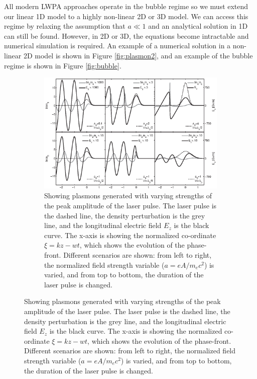 \documentclass[12pt,letter]{article}
\begin{document}
All modern LWPA approaches operate in the
bubble regime so we must extend our linear 1D model to a highly
non-linear  2D or 3D model. We can access this regime by relaxing 
the assumption that $a \ll 1$ and an analytical solution in 1D can still be
found\cite{sprangle1990nonlinear}. However, in 2D or 3D, the equations become intractable and numerical simulation is
required. An example of a numerical solution in a non-linear 2D model is shown
in Figure \ref{fig:plasmon2}, and an example of the bubble regime is shown in
Figure \ref{fig:bubble}.

\begin{figure}[h!]
        \begin{singlespace*}
        \centering
        \label{fig:plasmon}
        \begin{subfigure}[t]{\textwidth}
            \includegraphics[height = .35\textheight]{../figures/densityandewave.eps}
            \caption{\small  Showing plasmons generated with varying strengths of the peak
                amplitude of the laser pulse.\cite{genothesis}\label{fig:plasmon}
                The laser pulse is the dashed line, the density perturbation is the grey
                line, and the longitudinal electric field $E_z$ is the black
                curve. The x-axis is showing the normalized co-ordinate $\xi =
                kz - wt$, which shows the evolution of the phase-front. Different
                scenarios are shown: from left to right, the normalized field strength variable
                ($a = eA/m_e c^2$) is varied, and from top to bottom, the duration of
            the laser pulse is changed.}            \label{fig:plasmon1}
        \end{subfigure}


\end{singlespace*}
\end{figure}
\end{document}
